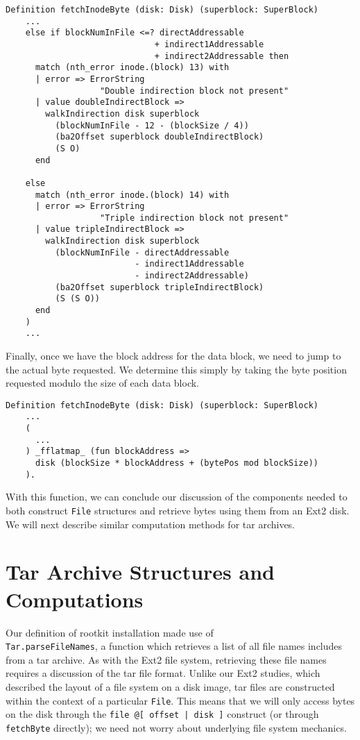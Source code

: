\documentclass[nocopyrightspace]{sigplanconf}
\begin{document}
\begin{lstlisting}
Definition fetchInodeByte (disk: Disk) (superblock: SuperBlock)
    ...
    else if blockNumInFile <=? directAddressable
                              + indirect1Addressable
                              + indirect2Addressable then
      match (nth_error inode.(block) 13) with
      | error => ErrorString 
                   "Double indirection block not present"
      | value doubleIndirectBlock =>
        walkIndirection disk superblock
          (blockNumInFile - 12 - (blockSize / 4)) 
          (ba2Offset superblock doubleIndirectBlock) 
          (S O)
      end

    else 
      match (nth_error inode.(block) 14) with
      | error => ErrorString 
                   "Triple indirection block not present"
      | value tripleIndirectBlock =>
        walkIndirection disk superblock 
          (blockNumInFile - directAddressable
                          - indirect1Addressable
                          - indirect2Addressable)
          (ba2Offset superblock tripleIndirectBlock)
          (S (S O))
      end
    ) 
    ...
\end{lstlisting}

Finally, once we have the block address for the data block, we need to jump to
the actual byte requested. We determine this simply by taking the byte
position requested modulo the size of each data block.

\begin{lstlisting}
Definition fetchInodeByte (disk: Disk) (superblock: SuperBlock)
    ...
    (
      ...
    ) _fflatmap_ (fun blockAddress =>
      disk (blockSize * blockAddress + (bytePos mod blockSize))
    ).
\end{lstlisting}

With this function, we can conclude our discussion of the components needed
to both construct {\tt File} structures and retrieve bytes using them from an
Ext2 disk. We will next describe similar computation methods for tar archives.

\section{Tar Archive Structures and Computations}
\label{sec:tar}

Our definition of rootkit installation made use of \\{\tt Tar.parseFileNames},
a function which retrieves a list of all file names includes from a tar
archive. As with the Ext2 file system, retrieving these file names requires a
discussion of the tar file format. Unlike our Ext2 studies, which described
the layout of a file system on a disk image, tar files are constructed within
the context of a particular {\tt File}. This means that we will only access
bytes on the disk through the {\tt file @[ offset | disk ]} construct (or
through {\tt fetchByte} directly); we need not worry about underlying file
system mechanics.
\end{document}
